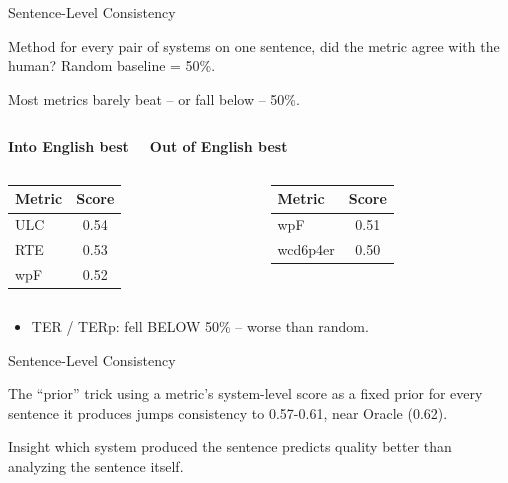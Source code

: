 \begin{frame}{Sentence-Level Consistency}

\begin{block}{Method}
for every pair of systems on one sentence, did the metric agree with the human? Random baseline = 50\%.
\end{block}

\vfill

Most metrics barely beat -- or fall below -- 50\%.

\vfill

\begin{columns}

\textbf{Into English best}

\textbf{Out of English best}
\end{columns}
\begin{columns}
\begin{table}
\centering
\begin{tabular}{l c}
\toprule
Metric & Score \\
\midrule
ULC & 0.54 \\
RTE & 0.53 \\
wpF & 0.52 \\
\bottomrule
\end{tabular}
\end{table}

\begin{table}
\centering
\begin{tabular}{l c}
\toprule
Metric & Score \\
\midrule
wpF & 0.51 \\
wcd6p4er & 0.50 \\
\bottomrule
\end{tabular}
\end{table}

\end{columns}

\vfill

\begin{itemize}
    \item TER / TERp: fell BELOW 50\% -- worse than random.
\end{itemize}

\end{frame}



\begin{frame}{Sentence-Level Consistency}

\begin{block}{The ``prior'' trick}
using a metric's system-level score as a fixed prior for every sentence it produces jumps consistency to 0.57-0.61, near Oracle (0.62).
\end{block}

\vfill

\begin{block}{Insight}
which system produced the sentence predicts quality better than analyzing the sentence itself.
\end{block}

\end{frame}



